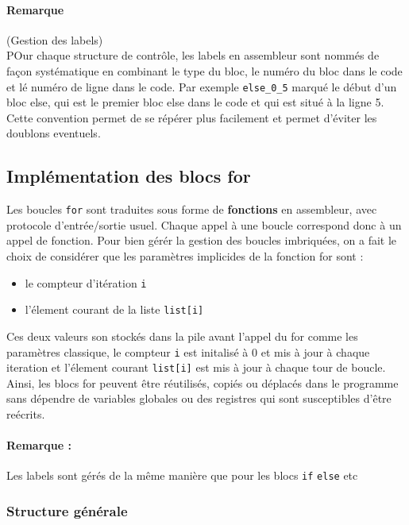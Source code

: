 \documentclass[a4paper, 12pt]{report}
\begin{document}
\paragraph*{Remarque}(Gestion des labels) \\
POur chaque structure de contrôle, les labels en assembleur sont nommés de façon systématique en combinant le type du bloc, le numéro du bloc dans le code et lé numéro de ligne dans le code. Par exemple \texttt{else\_0\_5} marqué le début d'un bloc else, qui est le premier bloc else dans le code et qui est situé à la ligne 5. Cette convention permet de se répérer plus facilement et permet d'éviter les doublons eventuels.

\subsection{Implémentation des blocs for}

Les boucles \texttt{for} sont traduites sous forme de \textbf{fonctions} en assembleur, avec protocole d'entrée/sortie usuel. Chaque appel à une boucle correspond donc à un appel de fonction. Pour bien gérér la gestion des boucles imbriquées, on a fait le choix de considérer que les paramètres implicides de la fonction for sont : 

\begin{itemize}
	\item le compteur d'itération \texttt{i}
	\item l'élement courant de la liste \texttt{list[i]}

\end{itemize}
Ces deux valeurs son stockés dans la pile avant l'appel du for comme les paramètres classique, le compteur \texttt{i} est initalisé à 0 et mis à jour à chaque iteration et l'élement courant \texttt{list[i]} est mis à jour à chaque tour de boucle. Ainsi, les blocs for peuvent être réutilisés, copiés ou déplacés dans le programme sans dépendre de variables globales ou des registres qui sont susceptibles d'être reécrits.

\paragraph*{Remarque : } Les labels sont gérés de la même manière que pour les blocs \texttt{if} \texttt{else} etc

\subsubsection{Structure générale}
\end{document}
